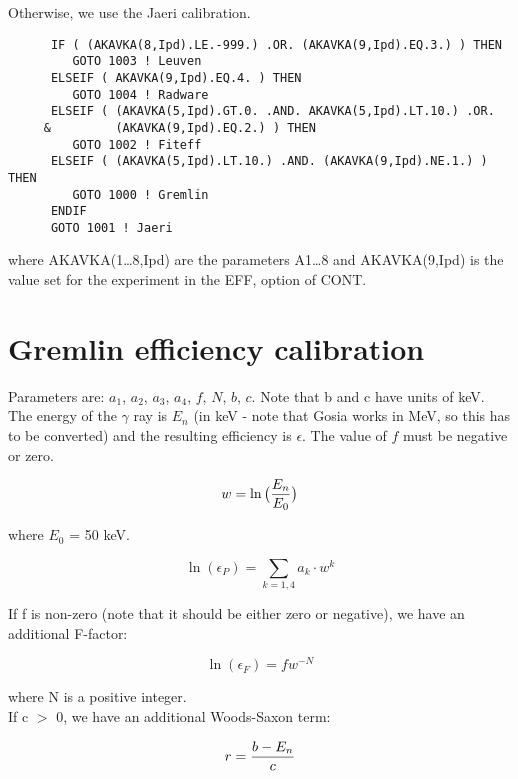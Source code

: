 Otherwise, we use the Jaeri calibration.

\begin{verbatim}
      IF ( (AKAVKA(8,Ipd).LE.-999.) .OR. (AKAVKA(9,Ipd).EQ.3.) ) THEN
         GOTO 1003 ! Leuven
      ELSEIF ( AKAVKA(9,Ipd).EQ.4. ) THEN
         GOTO 1004 ! Radware
      ELSEIF ( (AKAVKA(5,Ipd).GT.0. .AND. AKAVKA(5,Ipd).LT.10.) .OR. 
     &         (AKAVKA(9,Ipd).EQ.2.) ) THEN
         GOTO 1002 ! Fiteff
      ELSEIF ( (AKAVKA(5,Ipd).LT.10.) .AND. (AKAVKA(9,Ipd).NE.1.) ) THEN
         GOTO 1000 ! Gremlin
      ENDIF
      GOTO 1001 ! Jaeri
\end{verbatim}

where AKAVKA(1{\ldots}8,Ipd) are the parameters A1{\ldots}8 and
AKAVKA(9,Ipd) is the value set for the experiment in the EFF, option of CONT.

\section{Gremlin efficiency calibration}

Parameters are: $a_1$, $a_2$, $a_3$, $a_4$, $f$, $N$, $b$, $c$. Note that b
and c have units of keV. The energy of the $\gamma$ ray is $E_n$ (in keV -
note that Gosia works in MeV, so this has to be converted) and the resulting
efficiency is $\epsilon$. The value of $f$ must be negative or zero.

\begin{equation}
w = \ln\big({E_n \over E_0}\big)
\end{equation}

where $E_0$ = 50 keV.

\begin{equation}
\ln(\epsilon_P) = \sum_{k=1,4} a_k \cdot w^k
\end{equation}

If f is non-zero (note that it should be either zero or negative), we have
an additional F-factor:

\begin{equation}
\ln(\epsilon_F) = f w^{-N}
\end{equation}

where N is a positive integer.\\

If c $>$ 0, we have an additional Woods-Saxon term:

\begin{equation}
r = {b - E_n \over c}
\end{equation}

